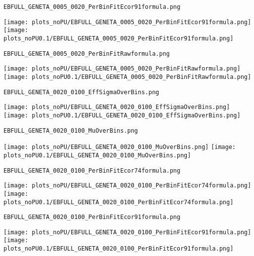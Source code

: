 \begin{frame}[fragile]
\begin{verbatim}
EBFULL_GENETA_0005_0020_PerBinFitEcor91formula.png
\end{verbatim}
\texttt{[image: plots\_noPU/EBFULL\_GENETA\_0005\_0020\_PerBinFitEcor91formula.png]}
\texttt{[image: plots\_noPU0.1/EBFULL\_GENETA\_0005\_0020\_PerBinFitEcor91formula.png]}
\end{frame}
\begin{frame}[fragile]
\begin{verbatim}
EBFULL_GENETA_0005_0020_PerBinFitRawformula.png
\end{verbatim}
\texttt{[image: plots\_noPU/EBFULL\_GENETA\_0005\_0020\_PerBinFitRawformula.png]}
\texttt{[image: plots\_noPU0.1/EBFULL\_GENETA\_0005\_0020\_PerBinFitRawformula.png]}
\end{frame}
\begin{frame}[fragile]
\begin{verbatim}
EBFULL_GENETA_0020_0100_EffSigmaOverBins.png
\end{verbatim}
\texttt{[image: plots\_noPU/EBFULL\_GENETA\_0020\_0100\_EffSigmaOverBins.png]}
\texttt{[image: plots\_noPU0.1/EBFULL\_GENETA\_0020\_0100\_EffSigmaOverBins.png]}
\end{frame}
\begin{frame}[fragile]
\begin{verbatim}
EBFULL_GENETA_0020_0100_MuOverBins.png
\end{verbatim}
\texttt{[image: plots\_noPU/EBFULL\_GENETA\_0020\_0100\_MuOverBins.png]}
\texttt{[image: plots\_noPU0.1/EBFULL\_GENETA\_0020\_0100\_MuOverBins.png]}
\end{frame}
\begin{frame}[fragile]
\begin{verbatim}
EBFULL_GENETA_0020_0100_PerBinFitEcor74formula.png
\end{verbatim}
\texttt{[image: plots\_noPU/EBFULL\_GENETA\_0020\_0100\_PerBinFitEcor74formula.png]}
\texttt{[image: plots\_noPU0.1/EBFULL\_GENETA\_0020\_0100\_PerBinFitEcor74formula.png]}
\end{frame}
\begin{frame}[fragile]
\begin{verbatim}
EBFULL_GENETA_0020_0100_PerBinFitEcor91formula.png
\end{verbatim}
\texttt{[image: plots\_noPU/EBFULL\_GENETA\_0020\_0100\_PerBinFitEcor91formula.png]}
\texttt{[image: plots\_noPU0.1/EBFULL\_GENETA\_0020\_0100\_PerBinFitEcor91formula.png]}
\end{frame}
